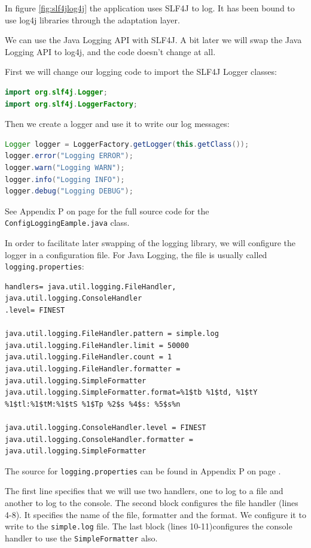 In figure \ref{fig:slf4jlog4j} the application uses SLF4J to log. It has been bound to use log4j libraries through the adaptation layer. 

We can use the Java Logging API with SLF4J. A bit later we will swap the Java Logging API to log4j, and the code doesn't change at all.

First we will change our logging code to import the SLF4J Logger classes:
\begin{lstlisting}[language=Java]
import org.slf4j.Logger;
import org.slf4j.LoggerFactory;
\end{lstlisting}

Then we create a logger and use it to write our log messages:
\begin{lstlisting}[language=Java]
Logger logger = LoggerFactory.getLogger(this.getClass());
logger.error("Logging ERROR");
logger.warn("Logging WARN");
logger.info("Logging INFO");
logger.debug("Logging DEBUG");
\end{lstlisting}

See Appendix P on page \pageref{App:AppendixP} for the full source code for the  \texttt{ConfigLoggingEample.java} class.

In order to facilitate later swapping of the logging library, we will configure the logger in a configuration file. For Java Logging, the file is usually called \texttt{logging.properties}:
\begin{lstlisting}
handlers= java.util.logging.FileHandler, java.util.logging.ConsoleHandler
.level= FINEST

java.util.logging.FileHandler.pattern = simple.log
java.util.logging.FileHandler.limit = 50000
java.util.logging.FileHandler.count = 1
java.util.logging.FileHandler.formatter = java.util.logging.SimpleFormatter
java.util.logging.SimpleFormatter.format=%1$tb %1$td, %1$tY %1$tl:%1$tM:%1$tS %1$Tp %2$s %4$s: %5$s%n

java.util.logging.ConsoleHandler.level = FINEST
java.util.logging.ConsoleHandler.formatter = java.util.logging.SimpleFormatter
\end{lstlisting}

The source for \texttt{logging.properties} can be found in Appendix P on page \pageref{App:AppendixP}.

The first line specifies that we will use two handlers, one to log to a file and another to log to the console. The second block configures the file handler (lines 4-8). It specifies the name of the file, formatter and the format. We configure it to write to the \texttt{simple.log} file. The last block (lines 10-11)configures the console handler to use the \texttt{SimpleFormatter} also.

